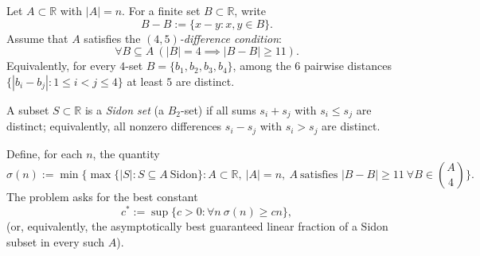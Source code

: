 Let $A\subset\mathbb{R}$ with $|A|=n$. For a finite set $B\subset\mathbb{R}$, write
\[
B-B:=\{x-y: x,y\in B\}.
\]
Assume that $A$ satisfies the \emph{$(4,5)$-difference condition}:
\[
\forall B\subseteq A\ (|B|=4\implies |B-B|\ge 11).
\]
Equivalently, for every $4$-set $B=\{b_1,b_2,b_3,b_4\}$, among the $6$ pairwise distances
$\{|b_i-b_j|:1\le i<j\le 4\}$ at least $5$ are distinct.

A subset $S\subset\mathbb{R}$ is a \emph{Sidon set} (a $B_2$-set) if all sums $s_i+s_j$ with
$s_i\le s_j$ are distinct; equivalently, all nonzero differences $s_i-s_j$ with $s_i>s_j$ are distinct.

Define, for each $n$, the quantity
\[
\sigma(n):=\min\Big\{\max\{|S|: S\subseteq A\ \text{Sidon}\}: A\subset\mathbb{R},\ |A|=n,\ A\ \text{satisfies }|B-B|\ge 11\ \forall B\in\binom{A}{4}\Big\}.
\]
The problem asks for the best constant
\[
 c^*:=\sup\{c>0: \forall n\ \sigma(n)\ge cn\},
\]
(or, equivalently, the asymptotically best guaranteed linear fraction of a Sidon subset in every such $A$).
